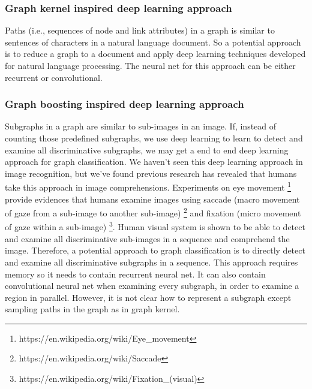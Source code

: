 \documentclass{article}
\begin{document}
\subsubsection{Graph kernel inspired deep learning approach}
Paths (i.e., sequences of node and link attributes) in a graph is similar to
sentences of characters in a natural language document.
So a potential approach is to reduce a graph to a document and apply deep learning techniques developed for natural language processing.
The neural net for this approach can be either recurrent or convolutional.

\subsubsection{Graph boosting inspired deep learning approach}
Subgraphs in a graph are similar to sub-images in an image.
If, instead of counting those predefined subgraphs,
we use deep learning to learn to detect and examine all discriminative subgraphs,
we may get a end to end deep learning approach for graph classification.
We haven't seen this deep learning approach in image recognition,
but we've found previous research has revealed 
that humans take this approach in image comprehensions.
Experiments on eye movement \footnote{https://en.wikipedia.org/wiki/Eye\_movement}
provide evidences that humans examine images using
saccade (macro movement of gaze from a sub-image to another sub-image)
\footnote{https://en.wikipedia.org/wiki/Saccade} and
fixation (micro movement of gaze within a sub-image)
\footnote{https://en.wikipedia.org/wiki/Fixation\_(visual)}.
Human visual system is shown to be able to detect and examine all discriminative
sub-images in a sequence and comprehend the image.
Therefore, a potential approach to graph classification is
to directly detect and examine all discriminative subgraphs in a sequence.
This approach requires memory so it needs to contain recurrent neural net.
It can also contain convolutional neural net when examining every subgraph,
in order to examine a region in parallel.
However, it is not clear how to represent a subgraph
except sampling paths in the graph as in graph kernel.



\end{document}
